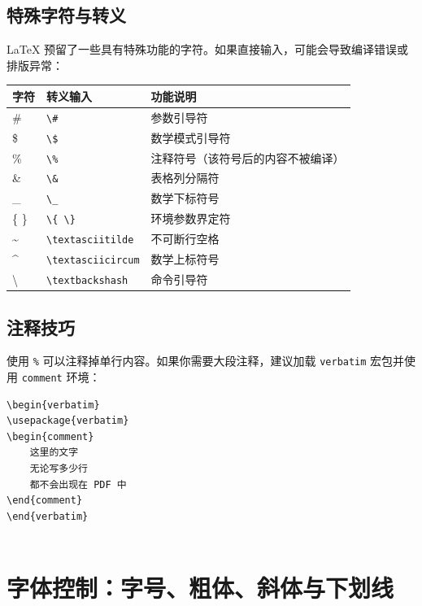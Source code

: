 \subsection{特殊字符与转义}
LaTeX 预留了一些具有特殊功能的字符。如果直接输入，可能会导致编译错误或排版异常：
\begin{table}
    \centering
    \begin{tabular}{lll}
        \hline
        字符 & 转义输入 & 功能说明 \\ \hline
        \# & \texttt{\textbackslash\#} & 参数引导符 \\
        \$ & \texttt{\textbackslash\$} & 数学模式引导符 \\
        \% & \texttt{\textbackslash\%} & 注释符号（该符号后的内容不被编译） \\
        \& & \texttt{\textbackslash\&} & 表格列分隔符 \\
        \_ & \texttt{\textbackslash\_} & 数学下标符号 \\
        \{ \} & \texttt{\textbackslash\{ \textbackslash\}} & 环境参数界定符 \\
        \textasciitilde & \texttt{\textbackslash textasciitilde} & 不可断行空格 \\
        \textasciicircum & \texttt{\textbackslash textasciicircum} & 数学上标符号 \\
        \textbackslash & \texttt{\textbackslash textbackshash} & 命令引导符 \\ \hline
    \end{tabular}
\end{table}

\subsection{注释技巧}
使用 \texttt{\%} 可以注释掉单行内容。如果你需要大段注释，建议加载 \texttt{verbatim} 宏包并使用 \texttt{comment} 环境：
\begin{lstlisting}
\begin{verbatim}
\usepackage{verbatim}
\begin{comment}
    这里的文字
    无论写多少行
    都不会出现在 PDF 中
\end{comment}
\end{verbatim}
    
\end{lstlisting}

\section{字体控制：字号、粗体、斜体与下划线}

